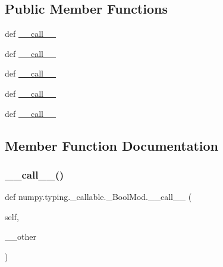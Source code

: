 \subsection*{Public Member Functions}
\begin{DoxyCompactItemize}
\item 
def \hyperlink{classnumpy_1_1typing_1_1__callable_1_1__BoolMod_a1720c7fa0fc2105a48d37381db659f32}{\+\_\+\+\_\+call\+\_\+\+\_\+}
\item 
def \hyperlink{classnumpy_1_1typing_1_1__callable_1_1__BoolMod_a1720c7fa0fc2105a48d37381db659f32}{\+\_\+\+\_\+call\+\_\+\+\_\+}
\item 
def \hyperlink{classnumpy_1_1typing_1_1__callable_1_1__BoolMod_a1720c7fa0fc2105a48d37381db659f32}{\+\_\+\+\_\+call\+\_\+\+\_\+}
\item 
def \hyperlink{classnumpy_1_1typing_1_1__callable_1_1__BoolMod_a1720c7fa0fc2105a48d37381db659f32}{\+\_\+\+\_\+call\+\_\+\+\_\+}
\item 
def \hyperlink{classnumpy_1_1typing_1_1__callable_1_1__BoolMod_a1720c7fa0fc2105a48d37381db659f32}{\+\_\+\+\_\+call\+\_\+\+\_\+}
\end{DoxyCompactItemize}


\subsection{Member Function Documentation}
\mbox{\label{classnumpy_1_1typing_1_1__callable_1_1__BoolMod_a1720c7fa0fc2105a48d37381db659f32}} 
\subsubsection{\texorpdfstring{\+\_\+\+\_\+call\+\_\+\+\_\+()}{\_\_call\_\_()}\hspace{0.1cm}{\footnotesize\ttfamily [1/5]}}
{\footnotesize\ttfamily def numpy.\+typing.\+\_\+callable.\+\_\+\+Bool\+Mod.\+\_\+\+\_\+call\+\_\+\+\_\+ (\begin{DoxyParamCaption}\item[{}]{self,  }\item[{}]{\+\_\+\+\_\+other }\end{DoxyParamCaption})}

